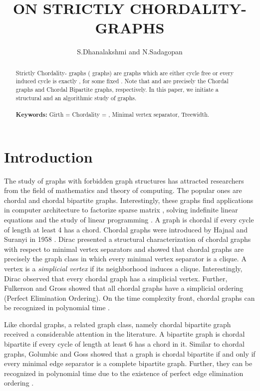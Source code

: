 \documentclass[runningheads]{llncs}
\date{}
\title{ON STRICTLY CHORDALITY- GRAPHS}
\author{ S.Dhanalakshmi and N.Sadagopan }
\institute{Indian Institute of Information Technology, Design and Manufacturing, Kancheepuram, Chennai, India. \\
\email{}}
\begin{document}
\maketitle
{}
\pagestyle{plain}




\begin{abstract}
Strictly Chordality- graphs ( graphs) are graphs which are either cycle free or every induced cycle is exactly , for some fixed . Note that  and  are precisely the Chordal graphs and Chordal Bipartite graphs, respectively. In this paper, we initiate a structural and an algorithmic study of  graphs. 
\\ \\
\textbf{Keywords:} Girth = Chordality = , Minimal vertex separator, Treewidth.
\end{abstract}


\section{Introduction}
The study of graphs with forbidden graph structures has attracted researchers from the field of mathematics and theory of computing. The popular ones are chordal and chordal bipartite graphs. Interestingly, these graphs find applications in computer architecture to factorize sparse matrix \cite{app1}, solving indefinite linear equations \cite{app2} and the study of linear programming \cite{app3}. A graph is chordal if every cycle of length at least 4 has a chord. Chordal graphs were introduced by Hajnal and Suranyi in 1958 \cite{Hajnal}. Dirac \cite{dirac} presented a structural characterization of chordal graphs with respect to minimal vertex separators and showed that chordal graphs are precisely the graph class in which every minimal vertex separator is a clique. A vertex is a \emph{simplicial vertex} if its neighborhood induces a clique. Interestingly, Dirac observed that every chordal graph has a simplicial vertex. Further, Fulkerson and Gross \cite{fulkerson} showed that all chordal graphs have a simplicial ordering (Perfect Elimination Ordering). On the time complexity front, chordal graphs can be recognized in polynomial time \cite{fulkerson,tarjan}.

Like chordal graphs, a related graph class, namely chordal bipartite graph received a considerable attention in the literature. A bipartite graph is chordal bipartite if every cycle of length at least 6 has a chord in it. Similar to chordal graphs, Golumbic and Goss \cite{GolumbicGoss} showed that a graph is chordal bipartite if and only if every minimal edge separator is a complete bipartite graph. Further, they can be recognized in polynomial time due to the existence of perfect edge elimination ordering \cite{GolumbicGoss}.
\end{document}
